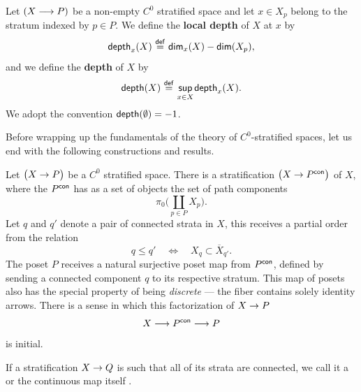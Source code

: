 \begin{definition}
    Let $(X \longrightarrow P)$ be a non-empty $C^0$ stratified space and let $x\in X_{p}$ belong to the stratum indexed by $p\in P$. We define the \textbf{local depth} of $X$ at $x$ by
    \begin{equation}
        \mathsf{depth}_{x}(X) \mkern1mu \overset{\sf def}{=} \mkern1mu \mathsf{dim}_{x}(X) - \mathsf{dim}(X_{p}),
    \end{equation}
    and we define the \textbf{depth} of $X$ by
    \begin{equation}
        \mathsf{depth}(X) \mkern1mu \overset{\sf def}{=} \mkern1mu \underset{x \in X}{\mathsf{sup}} \mkern1mu \mathsf{depth}_x(X).
    \end{equation}
    We adopt the convention $\mathsf{depth}(\emptyset)=-1$.
\end{definition}

\begin{observation}
Before wrapping up the fundamentals of the theory of $C^0$-stratified spaces, let us end with the following constructions and results.
\end{observation}

\begin{construction}
    Let $\big(X \rightarrow P \big)$ be a $C^0$ stratified space. There is a stratification $\big(X \rightarrow P^{\sf con}\big)$ of $X$, where the $P^{\sf con}$ has as a set of objects the set of path components 
    \begin{equation}
        \pi_0\Big(\coprod_{p \in P} X_p\Big).
    \end{equation}
    Let $q$ and $q'$ denote a pair of connected strata in $X$, this receives a partial order from the relation 
    \begin{equation}
        q \leq q' \quad \Leftrightarrow \quad X_q \subset \overline{X}_{q'}.  
    \end{equation}
    The poset $P$ receives a natural surjective poset map from $P^{\sf con}$, defined by sending a connected component $q$ to its respective stratum. This map of posets also has the special property of being \emph{discrete} — the fiber contains solely identity arrows. There is a sense in which this factorization of $X \rightarrow P$ 
    \begin{equation}
        X \longrightarrow P^{\sf con} \longrightarrow P
    \end{equation}
    is initial.
\end{construction}

\begin{remark}
    If a stratification $X \rightarrow Q$ is such that all of its strata are connected, we call it a  or the continuous map itself .
\end{remark}

